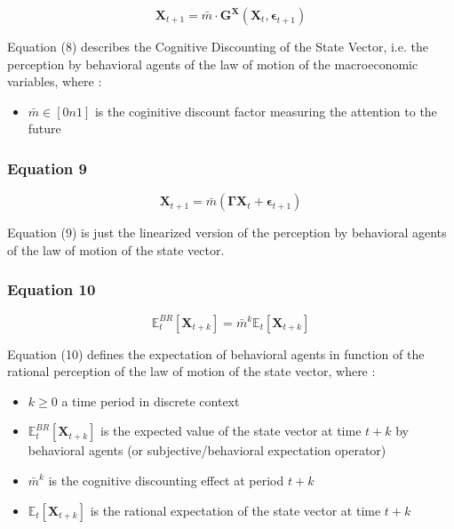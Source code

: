 \documentclass{article}
\begin{document}
\begin{equation}
    \bm{X}_{t+1}=\bar{m}\cdot\bm{G}^{\bm{X}}(\bm{X}_{t},\bm{\epsilon}_{t+1})
\end{equation}

Equation (8) describes the Cognitive Discounting of the State Vector, i.e. the perception by behavioral agents of the law of motion of the macroeconomic variables, where : 
\begin{itemize}
    \item $\bar{m}\in\left[0n1\right]$ is the coginitive discount factor measuring the attention to the future
\end{itemize}

\subsubsection*{Equation 9}

\begin{equation}
    \bm{X}_{t+1}=\bar{m}(\bm{\Gamma}\bm{X}_{t}+\bm{\epsilon}_{t+1})
\end{equation}

Equation (9) is just the linearized version of the perception by behavioral agents of the law of motion of the state vector. 

\subsubsection*{Equation 10}

\begin{equation}
    \mathbb{E}_{t}^{BR}\left[\bm{X}_{t+k}\right]=\bar{m}^{k}\mathbb{E}_{t}\left[\bm{X}_{t+k}\right]
\end{equation}

Equation (10) defines the expectation of behavioral agents in function of the rational perception of the law of motion of the state vector, where : 
\begin{itemize}
    \item $k\geq 0$ a time period in discrete context
    \item $\mathbb{E}_{t}^{BR}\left[\bm{X}_{t+k}\right]$ is the expected value of the state vector at time $t+k$ by behavioral agents (or subjective/behavioral expectation operator)
    \item $\bar{m}^{k}$ is the cognitive discounting effect at period $t+k$
    \item $\mathbb{E}_{t}\left[\bm{X}_{t+k}\right]$ is the rational expectation of the state vector at time $t+k$
\end{itemize}
\end{document}
